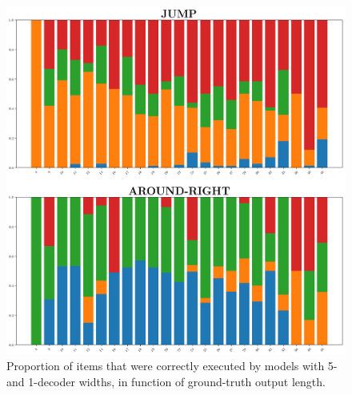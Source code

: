 \begin{figure}[tb]
    \centering
    \includegraphics[width=.5\textwidth,keepaspectratio]{figures/split_subset_out.png}
    \caption{Proportion of items that were correctly executed by
      models with 5- and 1-decoder widths, in function of ground-truth
      output length.}
    \label{fig:kernel_width}
\end{figure}


